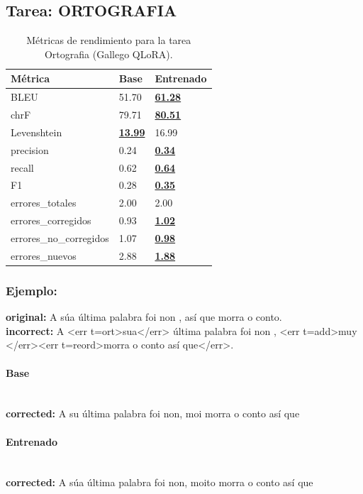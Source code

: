 \subsection{Tarea: ORTOGRAFIA}\label{tarea-ortografia}
\begin{longtable}[]{@{}lll@{}}
\toprule\noalign{}
Métrica & Base & Entrenado \\
\midrule\noalign{}
\endhead
\bottomrule\noalign{}
\caption{Métricas de rendimiento para la tarea Ortografia (Gallego QLoRA).}
\label{tab:metricas_ortografia_Gallego QLoRA}
\endlastfoot
BLEU & 51.70 & \textbf{\underline{61.28}} \\
chrF & 79.71 & \textbf{\underline{80.51}} \\
Levenshtein & \textbf{\underline{13.99}} & 16.99 \\
precision & 0.24 & \textbf{\underline{0.34}} \\
recall & 0.62 & \textbf{\underline{0.64}} \\
F1 & 0.28 & \textbf{\underline{0.35}} \\
errores\_totales & 2.00 & 2.00 \\
errores\_corregidos & 0.93 & \textbf{\underline{1.02}} \\
errores\_no\_corregidos & 1.07 & \textbf{\underline{0.98}} \\
errores\_nuevos & 2.88 & \textbf{\underline{1.88}} \\
\end{longtable}

\subsubsection{Ejemplo:}
\textbf{original:} A súa última palabra foi non , así que morra o conto.\\
\textbf{incorrect:} A {\textless}err t=ort{\textgreater}sua{\textless}/err{\textgreater} última palabra foi non , {\textless}err t=add{\textgreater}muy {\textless}/err{\textgreater}{\textless}err t=reord{\textgreater}morra o conto así que{\textless}/err{\textgreater}.

\paragraph{Base}~\\
\textbf{corrected:} A su última palabra foi non, moi morra o conto así que

\paragraph{Entrenado}~\\
\textbf{corrected:} A súa última palabra foi non, moito morra o conto así que

\vspace{1em}
